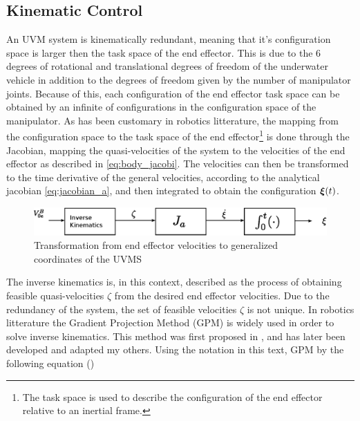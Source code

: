 \subsection{Kinematic Control}
An UVM system is kinematically redundant, meaning that it's configuration space is larger then the task space of the end effector. This is due to the 6 degrees of rotational and translational degrees of freedom of the underwater vehicle in addition to the degrees of freedom given by the number of manipulator joints. Because of this, each configuration of the end effector task space can be obtained by an infinite of configurations in the configuration space of the manipulator. 
As has been customary in robotics litterature, the mapping from the configuration space to the task space of the end effector\footnote{The task space is used to describe the configuration of the end effector relative to an inertial frame.} is done through the Jacobian, mapping the quasi-velocities of the system to the velocities of the end effector as described in \eqref{eq:body_jacobi}. The velocities can then be transformed to the time derivative of the general 
velocities, according to the analytical jacobian \eqref{eq:jacobian_a}, and then integrated to obtain the configuration $\boldsymbol \xi(t)$.

\begin{figure}[h!]
	\centering
	\includegraphics[scale=0.7]{./figures/inverse-kinematics1.eps}
	\caption{Transformation from end effector velocities to generalized coordinates of the UVMS}
	\label{fig:inverse1}
\end{figure}
The inverse kinematics is, in this context, described as the process of obtaining feasible quasi-velocities $\zeta$ from the desired end effector velocities. Due to the redundancy of the system, the set of feasible velocities $\zeta$ is not unique. In robotics litterature the Gradient Projection Method (GPM) is widely used in order to solve inverse kinematics. This method was first proposed in \cite{Liegeois1977}, and has later been developed and adapted my others.
Using the notation in this text, GPM by the following equation (\cite{Liegeois1977})

